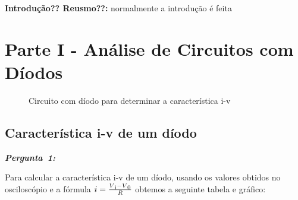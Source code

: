 \documentclass[pdftex,12pt,a4paper]{report}
\begin{document}
 

\renewcommand{\headrulewidth}{0pt}

\vspace*{\fill}
\textbf{Introdução?? Reusmo??:}
\begingroup
normalmente a introdução é feita 
\endgroup
\vspace*{\fill}
\newpage

\renewcommand*\contentsname{Conteúdos}
\renewcommand*\figurename{Figura}

\tableofcontents
\renewcommand{\headrulewidth}{0.15pt}
\renewcommand{\thechapter}{}

\clearpage

\section{Parte I - Análise de Circuitos com Díodos}
\begin{figure}[h]
\centerline{}
\caption{Circuito com díodo para determinar a característica i-v}\label{diodo_parte1}
\end{figure}

\subsection{Característica i-v de um díodo} 
\hbox{\emph{\textbf{Pergunta 1:}}\newline\newline}

Para calcular a característica i-v de um díodo, usando os valores obtidos no osciloscópio e a fórmula $i = \frac{V\textsubscript{i}-V\textsubscript{0}}{R}$ obtemos a seguinte tabela e gráfico:\newline

\endminipage\hfill
{}
\endminipage\hfill
\end{document}
